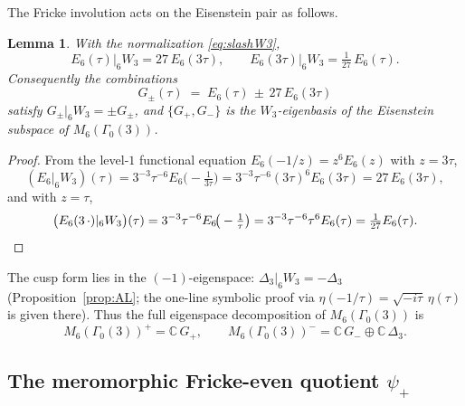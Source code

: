 \documentclass[11pt,reqno]{amsart}
\theoremstyle{plain}
\newtheorem{lemma}[theorem]{Lemma}
\theoremstyle{definition}
\theoremstyle{remark}
\newcommand{\C}{\mathbb{C}}
\newcommand{\Dthree}{\Delta_{3}}
\newcommand{\psip}{\psi_{+}}
\begin{document}
The Fricke involution acts on the Eisenstein pair as follows.

\begin{lemma}\label{lem:W3eisenstein}
With the normalization \eqref{eq:slashW3},
\[
E_6(\tau)\big|_6W_3=27\,E_6(3\tau),
\qquad
E_6(3\tau)\big|_6W_3=\tfrac1{27}\,E_6(\tau).
\]
Consequently the combinations
\[
G_{\pm}(\tau)\;=\;E_6(\tau)\,\pm\,27\,E_6(3\tau)
\]
satisfy $G_\pm|_6W_3=\pm G_\pm$, and
$\{G_+,G_-\}$ is the $W_3$-eigenbasis of the Eisenstein subspace of
$M_6(\Gamma_0(3))$.
\end{lemma}

\begin{proof}
From the level-$1$ functional equation $E_6(-1/z)=z^6E_6(z)$ with
$z=3\tau$,
\[
(E_6|_6W_3)(\tau)=3^{-3}\tau^{-6}E_6\!\big(-\tfrac1{3\tau}\big)
=3^{-3}\tau^{-6}(3\tau)^6E_6(3\tau)=27\,E_6(3\tau),
\]
and with $z=\tau$,
\[
\big(E_6(3\,\cdot)|_6W_3\big)(\tau)
=3^{-3}\tau^{-6}E_6\!\big(-\tfrac1{\tau}\big)
=3^{-3}\tau^{-6}\tau^{6}E_6(\tau)=\tfrac1{27}E_6(\tau).
\qedhere
\]
\end{proof}

The cusp form lies in the $(-1)$-eigenspace:
$\Dthree|_6W_3=-\Dthree$ (Proposition~\ref{prop:AL}; the one-line
symbolic proof via $\eta(-1/\tau)=\sqrt{-i\tau}\,\eta(\tau)$ is given
there).  Thus the full eigenspace decomposition of $M_6(\Gamma_0(3))$
is
\[
M_6(\Gamma_0(3))^{+}=\C\,G_+,
\qquad
M_6(\Gamma_0(3))^{-}=\C\,G_-\oplus\C\,\Dthree .
\]

\subsection{The meromorphic Fricke-even quotient
\texorpdfstring{$\psip$}{psi+}}\label{subsec:psiplus}
\end{document}
